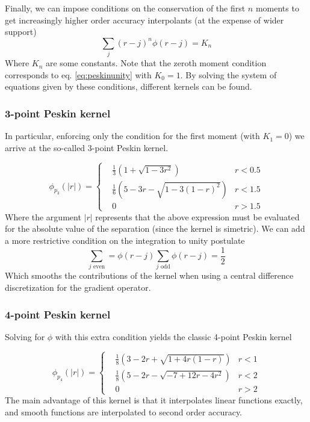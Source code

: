 \documentclass[ twoside,openright,titlepage,numbers=noenddot,%
headinclude,footinclude,cleardoublepage=empty,abstract=on,
BCOR=5mm,paper=a4,fontsize=11pt, dvipsnames
]{scrreprt}
\newcommand{\half}{\frac{1}{2}}
\begin{document}
Finally, we can impose conditions on the conservation of the first $n$ moments to get increasingly higher order accuracy interpolants (at the expense of wider support)
\begin{equation}
  \sum_j(r-j)^n\phi(r-j) = K_n
\end{equation}
Where $K_n$ are some constants. Note that the zeroth moment condition corresponds to eq. \eqref{eq:peskinunity} with $K_0 = 1$.
By solving the system of equations given by these conditions, different kernels can be found. 

\subsubsection*{3-point Peskin kernel}
In particular, enforcing only the condition for the first moment (with $K_1=0$) we arrive at the so-called 3-point Peskin kernel.

\begin{equation}
  \label{eq:peskin3}
  \phi_{p_3}(|r|) =  \left\{
  \begin{aligned}
    & \frac{1}{3}\left( 1 + \sqrt{1-3r^2}\right)& r < 0.5\\
    & \frac{1}{6}\left(5-3r-\sqrt{1-3(1-r)^2}\right)& r < 1.5\\
    & 0 & r>1.5 
  \end{aligned}\right.
\end{equation}
Where the argument $|r|$ represents that the above expression must be evaluated for the absolute value of the separation (since the kernel is simetric).
We can add a more restrictive condition on the integration to unity postulate
\begin{equation}
  \label{eq:evenodd}
  \sum_{j \textrm{ even}} =\phi(r-j)   \sum_{j \textrm{ odd}} \phi(r-j) = \half
\end{equation}
Which smooths the contributions of the kernel when using a central difference discretization for the gradient operator.
\subsubsection*{4-point Peskin kernel}
Solving for $\phi$ with this extra condition yields the classic 4-point Peskin kernel

\begin{equation}
  \label{eq:peskin4}
  \phi_{p_4}(|r|) =  \left\{
  \begin{aligned}
    & \frac{1}{8}\left( 3 - 2r + \sqrt{1+4r(1-r)}\right)& r < 1\\
    & \frac{1}{8}\left(5-2r-\sqrt{-7+12r-4r^2}\right)& r < 2\\
    & 0 & r>2
  \end{aligned}\right.
\end{equation}
The main advantage of this kernel is that it interpolates linear functions exactly, and smooth functions are interpolated to second order accuracy.
\end{document}
